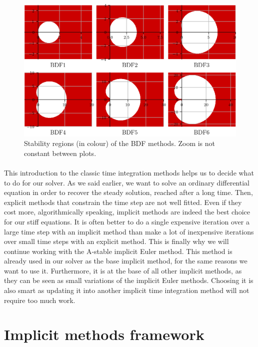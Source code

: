         \begin{figure}
          \centering
          \includegraphics{figures/bdf_stab.png}
          \caption{Stability regions (in colour) of the BDF methods. Zoom is not constant between plots.}
          \label{fig:bdf_stab}
        \end{figure}

      \paragraph{}
      This introduction to the classic time integration methods helps us to decide what to do for our solver.
      As we said earlier, we want to solve an ordinary differential equation in order to recover the steady solution, reached after a long time.
      Then, explicit methods that constrain the time step are not well fitted.
      Even if they cost more, algorithmically speaking, implicit methods are indeed the best choice for our stiff equations.
      It is often better to do a single expensive iteration over a large time step with an implicit method than make a lot of inexpensive iterations over small time steps with an explicit method.
      This is finally why we will continue working with the A-stable implicit Euler method.
      This method is already used in our solver as the base implicit method, for the same reasons we want to use it.
      Furthermore, it is at the base of all other implicit methods, as they can be seen as small variations of the implicit Euler methods.
      Choosing it is also smart as updating it into another implicit time integration method will not require too much work.


  \section{Implicit methods framework}


